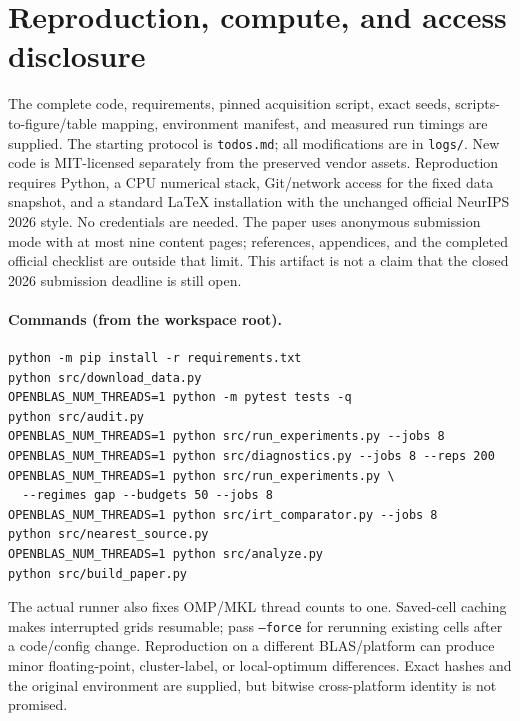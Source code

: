 \section{Reproduction, compute, and access disclosure}\label{app:repro}
The complete code, requirements, pinned acquisition script, exact seeds, scripts-to-figure/table mapping, environment manifest, and measured run timings are supplied. The starting protocol is \texttt{todos.md}; all modifications are in \texttt{logs/}. New code is MIT-licensed separately from the preserved vendor assets. Reproduction requires Python, a CPU numerical stack, Git/network access for the fixed data snapshot, and a standard LaTeX installation with the unchanged official NeurIPS 2026 style. No credentials are needed. The paper uses anonymous submission mode with at most nine content pages; references, appendices, and the completed official checklist are outside that limit. This artifact is not a claim that the closed 2026 submission deadline is still open.

\paragraph{Commands (from the workspace root).}
\begin{verbatim}
python -m pip install -r requirements.txt
python src/download_data.py
OPENBLAS_NUM_THREADS=1 python -m pytest tests -q
python src/audit.py
OPENBLAS_NUM_THREADS=1 python src/run_experiments.py --jobs 8
OPENBLAS_NUM_THREADS=1 python src/diagnostics.py --jobs 8 --reps 200
OPENBLAS_NUM_THREADS=1 python src/run_experiments.py \
  --regimes gap --budgets 50 --jobs 8
OPENBLAS_NUM_THREADS=1 python src/irt_comparator.py --jobs 8
python src/nearest_source.py
OPENBLAS_NUM_THREADS=1 python src/analyze.py
python src/build_paper.py
\end{verbatim}
The actual runner also fixes OMP/MKL thread counts to one. Saved-cell caching makes interrupted grids resumable; pass \texttt{--force} for rerunning existing cells after a code/config change. Reproduction on a different BLAS/platform can produce minor floating-point, cluster-label, or local-optimum differences. Exact hashes and the original environment are supplied, but bitwise cross-platform identity is not promised.


